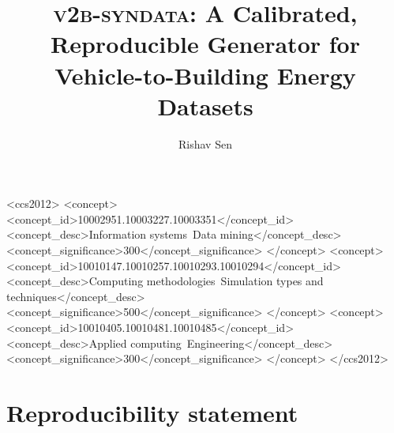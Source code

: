\documentclass[sigconf,natbib=true]{acmart}
\newcommand{\generator}{\textsc{v2b-syndata}}
\begin{document}
\title{\generator{}: A Calibrated, Reproducible Generator for
Vehicle-to-Building Energy Datasets}

\author{Rishav Sen}

\begin{abstract}

\end{abstract}

\begin{CCSXML}
<ccs2012>
<concept>
<concept_id>10002951.10003227.10003351</concept_id>
<concept_desc>Information systems~Data mining</concept_desc>
<concept_significance>300</concept_significance>
</concept>
<concept>
<concept_id>10010147.10010257.10010293.10010294</concept_id>
<concept_desc>Computing methodologies~Simulation types and techniques</concept_desc>
<concept_significance>500</concept_significance>
</concept>
<concept>
<concept_id>10010405.10010481.10010485</concept_id>
<concept_desc>Applied computing~Engineering</concept_desc>
<concept_significance>300</concept_significance>
</concept>
</ccs2012>
\end{CCSXML}


\maketitle











\section*{Reproducibility statement}


\begin{acks}
\end{acks}




\appendix

\end{document}
